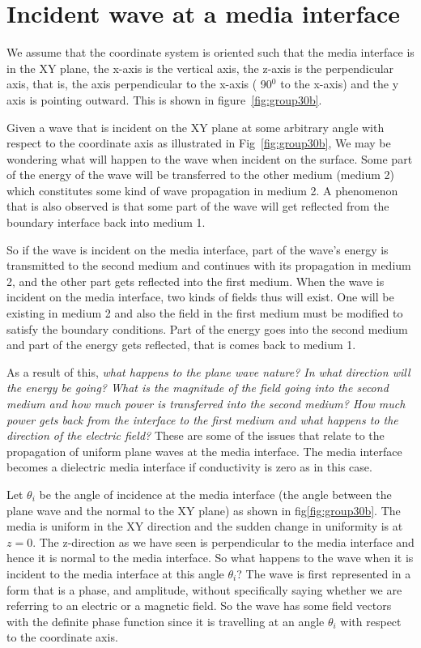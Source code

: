 \section{Incident wave at a media interface}
We assume that the coordinate system is oriented such that the media interface is in the XY plane, the x-axis is the vertical axis, the z-axis is the perpendicular axis, that is, the axis perpendicular to the x-axis ( 90$^{0}$ to the x-axis) and the y axis is pointing outward. This is shown in figure~\ref{fig:group30b}.

Given a wave that is incident on the XY plane at some arbitrary angle with respect to the coordinate axis as illustrated in Fig~\ref{fig:group30b}, We may be wondering what will happen to the wave when incident on the surface. Some part of the energy of the wave will be transferred to the other medium (medium 2) which constitutes some kind of wave propagation in medium 2. A phenomenon that is also observed is that some part of the wave will get reflected from the boundary interface back into medium 1.

So if the wave is incident on the media interface, part of the wave's energy is transmitted to the second medium and continues with its propagation in medium 2, and the other part gets reflected into the first medium. When the wave is incident on the media interface, two kinds of fields thus will exist. One will be existing in medium 2 and also the field in the first medium must be modified to satisfy the boundary conditions. Part of the energy goes into the second medium and part of the energy gets reflected, that is comes back to medium 1.

As a result of this, \emph{what happens to the plane wave nature? In what direction will the energy be going? What is the magnitude of the field going into the second medium and how much power is transferred into the second medium? How much power gets back from the interface to the first medium and what happens to the direction of the electric field?} These are some of the issues that relate to the propagation of uniform plane waves at the media interface. The media interface becomes a dielectric media interface if conductivity is zero as in this case.

Let $\theta_i$ be the angle of incidence at the media interface (the angle between the plane wave and the normal to the XY plane) as shown in fig\ref{fig:group30b}. The media is uniform in the XY direction and the sudden change in uniformity is at $z=0$. The z-direction as we have seen is perpendicular to the media interface and hence it is normal to the media interface. So what happens to the wave when it is incident to the media interface at this angle $\theta_i$? The wave is first represented in a form that is a phase, and amplitude, without specifically saying whether we are referring to an electric or a magnetic field. So the wave has some field vectors with the definite phase function since it is travelling at an angle $\theta_i$ with respect to the coordinate axis.	

